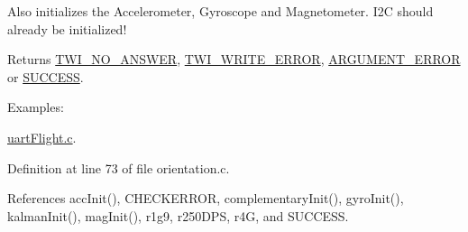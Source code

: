 Also initializes the Accelerometer, Gyroscope and Magnetometer. I2\-C should already be initialized! \begin{DoxyReturn}{Returns}
\hyperlink{group__error_gga2c3e4bb40f36b262a5214e2da2bca9c5a04d5943ba652af2205c88b247e0c659c}{T\-W\-I\-\_\-\-N\-O\-\_\-\-A\-N\-S\-W\-E\-R}, \hyperlink{group__error_gga2c3e4bb40f36b262a5214e2da2bca9c5ac0e3b3463dcaf220e54794b4711708c9}{T\-W\-I\-\_\-\-W\-R\-I\-T\-E\-\_\-\-E\-R\-R\-O\-R}, \hyperlink{group__error_gga2c3e4bb40f36b262a5214e2da2bca9c5a49ccf277a69dd938c591928aa27c66cc}{A\-R\-G\-U\-M\-E\-N\-T\-\_\-\-E\-R\-R\-O\-R} or \hyperlink{group__error_gga2c3e4bb40f36b262a5214e2da2bca9c5ac7f69f7c9e5aea9b8f54cf02870e2bf8}{S\-U\-C\-C\-E\-S\-S}. 
\end{DoxyReturn}
\begin{Desc}
\item[Examples\-: ]\par
\hyperlink{uart_flight_8c-example}{uart\-Flight.\-c}.\end{Desc}


Definition at line 73 of file orientation.\-c.



References acc\-Init(), C\-H\-E\-C\-K\-E\-R\-R\-O\-R, complementary\-Init(), gyro\-Init(), kalman\-Init(), mag\-Init(), r1g9, r250\-D\-P\-S, r4\-G, and S\-U\-C\-C\-E\-S\-S.


